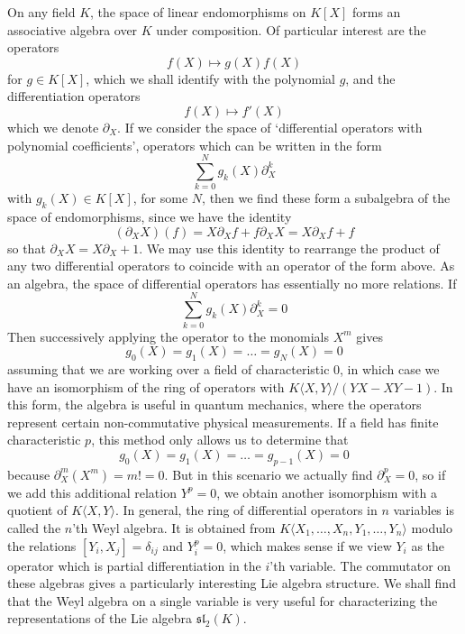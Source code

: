 \begin{example}
    On any field $K$, the space of linear endomorphisms on $K[X]$ forms an associative algebra over $K$ under composition. Of particular interest are the operators
    \[ f(X) \mapsto g(X) f(X) \]
    for $g \in K[X]$, which we shall identify with the polynomial $g$, and the differentiation operators
    \[ f(X) \mapsto f'(X) \]
    which we denote $\partial_X$. If we consider the space of `differential operators with polynomial coefficients', operators which can be written in the form
    \[ \sum_{k = 0}^N g_k(X) \partial_X^k \]
    with $g_k(X) \in K[X]$, for some $N$, then we find these form a subalgebra of the space of endomorphisms, since we have the identity
    \[ (\partial_X X)(f) = X \partial_X f + f \partial_X X = X \partial_X f + f \]
    so that $\partial_X X = X \partial_X + 1$. We may use this identity to rearrange the product of any two differential operators to coincide with an operator of the form above. As an algebra, the space of differential operators has essentially no more relations. If
    \[ \sum_{k = 0}^N g_k(X) \partial_X^k = 0 \]
    Then successively applying the operator to the monomials $X^m$ gives
    \[ g_0(X) = g_1(X) = \dots = g_N(X) = 0 \]
    assuming that we are working over a field of characteristic 0, in which case we have an isomorphism of the ring of operators with $K \langle X, Y \rangle / (YX - XY - 1)$. In this form, the algebra is useful in quantum mechanics, where the operators represent certain non-commutative physical measurements. If a field has finite characteristic $p$,  this method only allows us to determine that
    \[ g_0(X) = g_1(X) = \dots = g_{p-1}(X) = 0 \]
    because $\partial_X^m(X^m) = m! = 0$. But in this scenario we actually find $\partial_X^p = 0$, so if we add this additional relation $Y^p = 0$, we obtain another isomorphism with a quotient of $K \langle X, Y \rangle$. In general, the ring of differential operators in $n$ variables is called the $n$'th Weyl algebra. It is obtained from $K\langle X_1, \dots, X_n, Y_1, \dots, Y_n \rangle$ modulo the relations $[Y_i, X_j] = \delta_{ij}$ and $Y_i^p = 0$, which makes sense if we view $Y_i$ as the operator which is partial differentiation in the $i$'th variable. The commutator on these algebras gives a particularly interesting Lie algebra structure. We shall find that the Weyl algebra on a single variable is very useful for characterizing the representations of the Lie algebra $\mathfrak{sl}_2(K)$.
\end{example}

